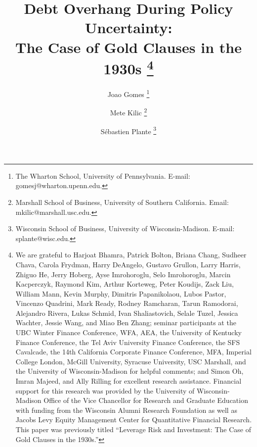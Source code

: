 \documentclass[hidelinks,12pt]{article}
\newcounter{c1}
\newcounter{c2}
\newcounter{c4}
\newcounter{c5}
\begin{document}

\begin{titlepage} 
\title{{ \large \textbf{Debt Overhang During Policy Uncertainty: \\  The Case of Gold Clauses in the 1930s}\!\!}
\thanks{We are grateful to Harjoat Bhamra, Patrick Bolton, Briana Chang, Sudheer Chava, Carola Frydman, Harry DeAngelo, Gustavo Grullon, Larry Harris, Zhiguo He, Jerry Hoberg, Ayse Imrohoroglu, Selo Imrohoroglu, Marcin Kacperczyk, Raymond Kim, Arthur Korteweg, Peter Koudijs, Zack Liu, William Mann, Kevin Murphy, Dimitris Papanikolaou, Lubos Pastor, Vincenzo Quadrini, Mark Ready, Rodney Ramcharan, Tarun Ramodorai, Alejandro Rivera, Lukas Schmid, Ivan Shaliastovich, Selale Tuzel, Jessica Wachter, Jessie Wang, and Miao Ben Zhang; seminar participants at the UBC Winter Finance Conference, WFA, AEA, the University of Kentucky Finance Conference, the Tel Aviv University Finance Conference, the SFS Cavalcade, the 14th California Corporate Finance Conference, MFA, Imperial College London, McGill University, Syracuse University, USC Marshall, and the University of Wisconsin-Madison for helpful comments; and Simon Oh, Imran Majeed, and Ally Rilling for excellent research assistance. Financial support for this research was provided by the University of Wisconsin-Madison Office of the Vice Chancellor for Research and Graduate Education with funding from the Wisconsin Alumni Research Foundation as well as Jacobs Levy Equity Management Center for Quantitative Financial Research. This paper was previously titled ``Leverage Risk and Investment: The Case of Gold Clauses in the 1930s.''}\vspace*{4mm}}

\author{Joao Gomes 
\footnote{The Wharton School, University of Pennsylvania. E-mail: gomesj@wharton.upenn.edu.} \\
\and 
Mete Kilic 
\footnote{Marshall School of Business, University of Southern California. Email: mkilic@marshall.usc.edu.}
\and 
S\'ebastien Plante
\footnote{Wisconsin School of Business, University of Wisconsin-Madison. E-mail: splante@wisc.edu.} \vspace*{10mm}}



\maketitle
\thispagestyle{empty}

\vspace*{-1cm}
\begin{abstract}
\small 

\onehalfspacing

 
%

\end{abstract}



\end{titlepage}
\end{document}

